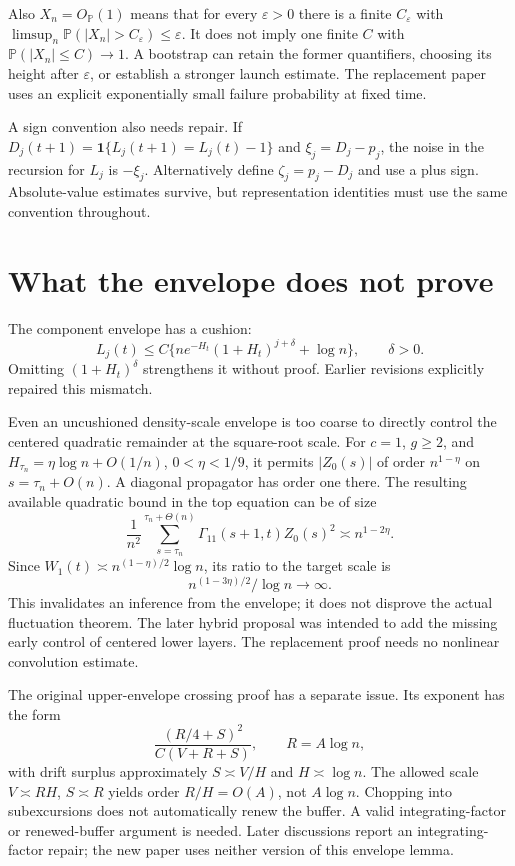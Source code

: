 \documentclass[11pt]{article}
\newcommand{\Pbb}{\mathbb P}
\begin{document}
Also $X_n=O_{\Pbb}(1)$ means that for every $\varepsilon>0$ there is a
finite $C_\varepsilon$ with
$\limsup_n\Pbb(|X_n|>C_\varepsilon)\le\varepsilon$.
It does not imply one finite $C$ with $\Pbb(|X_n|\le C)\to1$.
A bootstrap can retain the former quantifiers, choosing its height after
$\varepsilon$, or establish a stronger launch estimate. The replacement
paper uses an explicit exponentially small failure probability at fixed time.

A sign convention also needs repair. If
$D_j(t+1)=\mathbf1\{L_j(t+1)=L_j(t)-1\}$ and $\xi_j=D_j-p_j$,
the noise in the recursion for $L_j$ is $-\xi_j$. Alternatively define
$\zeta_j=p_j-D_j$ and use a plus sign. Absolute-value estimates survive,
but representation identities must use the same convention throughout.

\section{What the envelope does not prove}
The component envelope has a cushion:
\[
 L_j(t)\le C\{ne^{-H_t}(1+H_t)^{j+\delta}+\log n\},\qquad\delta>0.
\]
Omitting $(1+H_t)^\delta$ strengthens it without proof. Earlier revisions
explicitly repaired this mismatch.

Even an uncushioned density-scale envelope is too coarse to directly control
the centered quadratic remainder at the square-root scale. For $c=1$,
$g\ge2$, and $H_{\tau_n}=\eta\log n+O(1/n)$, $0<\eta<1/9$,
it permits $|Z_0(s)|$ of order $n^{1-\eta}$ on
$s=\tau_n+O(n)$. A diagonal propagator has order one there. The resulting
available quadratic bound in the top equation can be of size
\[
 \frac1{n^2}\sum_{s=\tau_n}^{\tau_n+\Theta(n)}
 \Gamma_{11}(s+1,t)Z_0(s)^2\asymp n^{1-2\eta}.
\]
Since $W_1(t)\asymp n^{(1-\eta)/2}\log n$, its ratio to the target scale is
\[
 n^{(1-3\eta)/2}/\log n\longrightarrow\infty.
\]
This invalidates an inference from the envelope; it does not disprove the
actual fluctuation theorem. The later hybrid proposal was intended to add
the missing early control of centered lower layers. The replacement proof
needs no nonlinear convolution estimate.

The original upper-envelope crossing proof has a separate issue. Its exponent
has the form
\[
 \frac{(R/4+S)^2}{C(V+R+S)},\qquad R=A\log n,
\]
with drift surplus approximately $S\asymp V/H$ and $H\asymp\log n$.
The allowed scale $V\asymp RH$, $S\asymp R$ yields order $R/H=O(A)$,
not $A\log n$. Chopping into subexcursions does not automatically renew the
buffer. A valid integrating-factor or renewed-buffer argument is needed.
Later discussions report an integrating-factor repair; the new paper uses
neither version of this envelope lemma.
\end{document}
